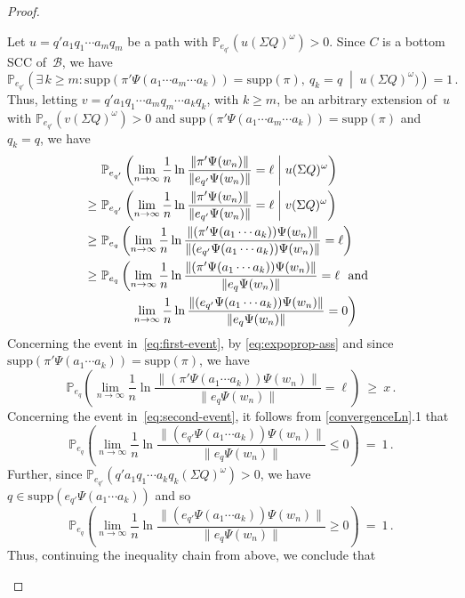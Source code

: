 \documentclass[a4paper,UKenglish,cleveref, autoref,mathscr]{lipics-v2019}
\newcommand{\PP}{\mathbb{P}}
\newcommand{\1}{\mathbbm{1}}
\newcommand{\supp}{\mathrm{supp}}
\newcommand{\B}{\mathcal{B}}
\newcommand{\stefan}[1]{\marginpar{\textcolor{blue}{#1}}}
\renewcommand{\stefan}[1]{}
\begin{document}
\begin{proof}
\begin{enumerate}
Let $u = q' a_1 q_1 \cdots a_m q_m$ be a path with $\PP_{e_{q'}}(u (\Sigma Q)^\omega) > 0$.
Since $C$ is a bottom SCC of~$\B$, we have
\[
\PP_{e_{q'}}\left( \exists\,k \ge m : \supp(\pi' \Psi(a_1 \cdots a_m \cdots a_k)) = \supp(\pi),\ q_k = q \;\middle\vert\; u (\Sigma Q)^\omega) \right)=1\,.
\]
Thus, letting $v = q' a_1 q_1 \cdots a_m q_m \cdots a_k q_k$, with $k \ge m$, be an arbitrary extension of~$u$ with $\PP_{e_{q'}}(v (\Sigma Q)^\omega) > 0$ and $\supp(\pi' \Psi(a_1 \cdots a_m \cdots a_k)) = \supp(\pi)$ and $q_k = q$, we have
\begin{align}
 & \PP_{e_{q'}}\left(\lim_{n \to \infty} \frac1n \ln \frac{\| \pi' \Psi(w_n) \|}{\| e_{q'} \Psi(w_n) \|} = \ell \;\middle\vert\; u (\Sigma Q)^\omega \right) \notag\\
 \ge\ & \PP_{e_{q'}}\left(\lim_{n \to \infty} \frac1n \ln \frac{\| \pi' \Psi(w_n) \|}{\| e_{q'} \Psi(w_n) \|} = \ell \;\middle\vert\; v (\Sigma Q)^\omega \right) \notag\\
 \ge\ & \PP_{e_q}\left( \lim_{n \to \infty} \frac1n \ln \frac{\| (\pi' \Psi(a_1 \cdots a_k)) \Psi(w_n) \|}{ \| (e_{q'} \Psi(a_1 \cdots a_k)) \Psi(w_n) \|} = \ell \right) \notag\\
 \ge\ & \PP_{e_q}\left( \lim_{n \to \infty} \frac1n \ln \frac{\| (\pi' \Psi(a_1 \cdots a_k)) \Psi(w_n) \|}{ \| e_{q} \Psi(w_n) \|} = \ell \ \text{ and } \right. \label{eq:first-event} \\
      & \qquad\ \left. \lim_{n \to \infty} \frac1n \ln \frac{\| (e_{q'} \Psi(a_1 \cdots a_k)) \Psi(w_n) \|}{ \| e_{q} \Psi(w_n) \|} = 0 \right) \label{eq:second-event}
\end{align}
Concerning the event in~\eqref{eq:first-event}, by \eqref{eq:expoprop-ass} and since $\supp(\pi' \Psi(a_1 \cdots a_k)) = \supp(\pi)$, we have
\[
\PP_{e_q}\left( \lim_{n \to \infty} \frac1n \ln \frac{\| (\pi' \Psi(a_1 \cdots a_k)) \Psi(w_n) \|}{ \| e_{q} \Psi(w_n) \|} = \ell \right)
\ \ge\ x\,.
\]
Concerning the event in~\eqref{eq:second-event}, it follows from \cref{convergenceLn}.1 \stefan{better reference?} that
\[
\PP_{e_q}\left( \lim_{n \to \infty} \frac1n \ln \frac{\| (e_{q'} \Psi(a_1 \cdots a_k)) \Psi(w_n) \|}{ \| e_{q} \Psi(w_n) \|} \le 0 \right) \ = \ 1\,.
\]
Further, since $\PP_{e_{q'}}(q' a_1 q_1 \cdots a_k q_k (\Sigma Q)^\omega) > 0$, we have $q \in \supp(e_{q'} \Psi(a_1 \cdots a_k))$ and so
\[
\PP_{e_q}\left( \lim_{n \to \infty} \frac1n \ln \frac{\| (e_{q'} \Psi(a_1 \cdots a_k)) \Psi(w_n) \|}{ \| e_{q} \Psi(w_n) \|} \ge 0 \right) \ = \ 1\,.
\]
Thus, continuing the inequality chain from above, we conclude that

\end{enumerate}
\end{proof}
\end{document}
